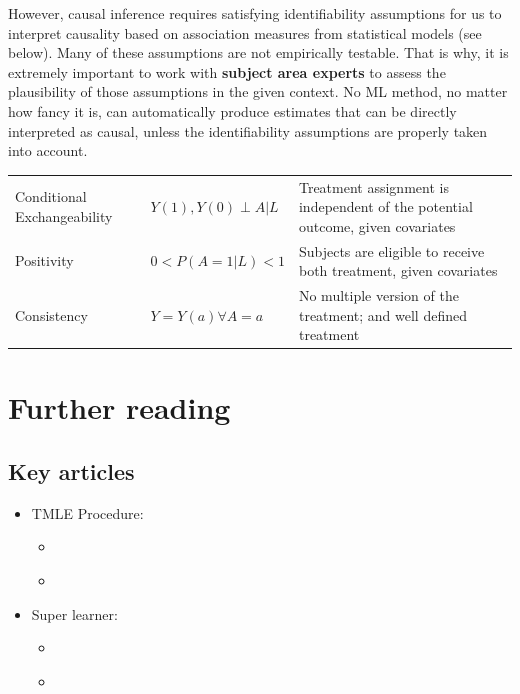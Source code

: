 \documentclass[
]{book}
\providecommand{\tightlist}{%
  \setlength{\itemsep}{0pt}\setlength{\parskip}{0pt}}
\begin{document}
However, causal inference requires satisfying identifiability assumptions for us to interpret causality based on association measures from statistical models (see below). Many of these assumptions are not empirically testable. That is why, it is extremely important to work with \textbf{subject area experts} to assess the plausibility of those assumptions in the given context. No ML method, no matter how fancy it is, can automatically produce estimates that can be directly interpreted as causal, unless the identifiability assumptions are properly taken into account.

\begin{longtable}[]{@{}
  >{\raggedright\arraybackslash}p{}
  >{\raggedright\arraybackslash}p{}
  >{\raggedright\arraybackslash}p{}@{}}
\toprule
& & \\
\midrule
\endhead
Conditional Exchangeability & \(Y(1), Y(0) \perp A | L\) & Treatment assignment is independent of the potential outcome, given covariates \\
Positivity & \(0 < P(A=1 | L) < 1\) & Subjects are eligible to receive both treatment, given covariates \\
Consistency & \(Y = Y(a) \forall A=a\) & No multiple version of the treatment; and well defined treatment \\
\bottomrule
\end{longtable}

\hypertarget{further-reading}{%
\section{Further reading}\label{further-reading}}

\hypertarget{key-articles}{%
\subsection{Key articles}\label{key-articles}}

\begin{itemize}
\tightlist
\item
  TMLE Procedure:

  \begin{itemize}
  \tightlist
  \item
    \citet{luque2018targeted}
  \item
    \citet{schuler2017targeted}
  \end{itemize}
\item
  Super learner:

  \begin{itemize}
  \tightlist
  \item
    \citet{rose2013mortality}
  \item
    \citet{naimi2018stacked}
  \end{itemize}
\end{itemize}
\end{document}
